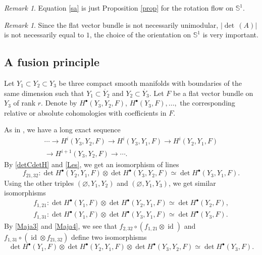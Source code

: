 \documentclass[JEP,XML,SOM,Unicode]{cedram}
\newcommand{\sbullet}{{\scriptscriptstyle\bullet}}
\theoremstyle{plain}
\theoremstyle{definition}
\theoremstyle{remark}
\newtheorem{re}[lem]{Remark}
\newcommand{\bbS}{\mathbb{S}}
\DeclareMathOperator{\id}{id}
\begin{document}
\begin{re}
Equation \eqref{sa} is just Proposition \ref{prop} for the rotation flow on $\bbS^{1}$.
\end{re}

\begin{re}
Since the flat vector bundle is not necessarily unimodular, \ie $|{\det\,}(A)|$ is
not necessarily equal to $1$, the choice of the
orientation on $\bbS^{1}$ is very important.
\end{re}

\subsection{A fusion principle}\label{Fp}
Let $Y_{1}\subset Y_{2}\subset Y_{3}$ be three compact smooth
manifolds with boundaries of
the same dimension such that $Y_{1}\subset \mathring{Y_{2}}$ and
$Y_{2}\subset \mathring{Y_{3}}$. Let $F$ be a flat vector bundle on
$Y_{3}$ of rank $r$. Denote by $H^{\sbullet}(Y_{3},Y_{2},F)$,
$H^{\sbullet}(Y_{3},F), \ldots,$ the corresponding relative or absolute
cohomologies with coefficients in $F$.

As in \cite[(0.16)]{BruningMa_2012}, we have a long exact sequence
\begin{multline}\label{Les}
\cdots\to H^{i}(Y_{3},Y_{2},F)\to H^{i}(Y_{3},Y_{1},F)\to
H^{i}(Y_{2},Y_{1},F)\\
\to H^{i+1}(Y_{3},Y_{2},F) \to \cdots.
\end{multline}
By \eqref{detCdetH} and \eqref{Les}, we get an isomorphism of lines
\begin{equation}\label{Maja3}
f_{21,32 }:\det H^{\sbullet}(Y_{2},Y_{1},F)\otimes \det H^{\sbullet}(Y_{3},Y_{2},F)\simeq \det H^{\sbullet}(Y_{3},Y_{1},F).
\end{equation}
Using the other triples $(\varnothing,Y_{1},Y_{2})$ and
$(\varnothing,Y_{1},Y_{3})$, we get similar isomorphisms
\begin{equation}\label{Maja4}
\begin{aligned}
f_{1,21}: \det H^{\sbullet}(Y_{1},F)\otimes \det
H^{\sbullet}(Y_{2},Y_{1},F)\simeq \det H^{\sbullet}(Y_{2},F),\\
f_{1,31}: \det H^{\sbullet}(Y_{1},F)\otimes \det
H^{\sbullet}(Y_{3},Y_{1},F)\simeq \det H^{\sbullet}(Y_{3},F).
\end{aligned}
\end{equation}
By \eqref{Maja3} and \eqref{Maja4}, we see that
$f_{2,32}\circ(f_{1,21}\otimes\id) $ and $f_{1,31}\circ (\id \otimes f_{21,32})$
define two isomorphisms
\begin{equation}\label{FYYY}
\det H^{\sbullet}(Y_{1},F)\otimes \det H^{\sbullet}(Y_{2},Y_{1},F)\otimes \det
H^{\sbullet}(Y_{3},Y_{2},F) \simeq \det H^{\sbullet}(Y_{3},F).
\end{equation}
\end{document}
